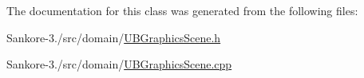 The documentation for this class was generated from the following files\-:\begin{DoxyCompactItemize}
\item 
Sankore-\/3./src/domain/\hyperlink{_u_b_graphics_scene_8h}{U\-B\-Graphics\-Scene.\-h}\item 
Sankore-\/3./src/domain/\hyperlink{_u_b_graphics_scene_8cpp}{U\-B\-Graphics\-Scene.\-cpp}\end{DoxyCompactItemize}
